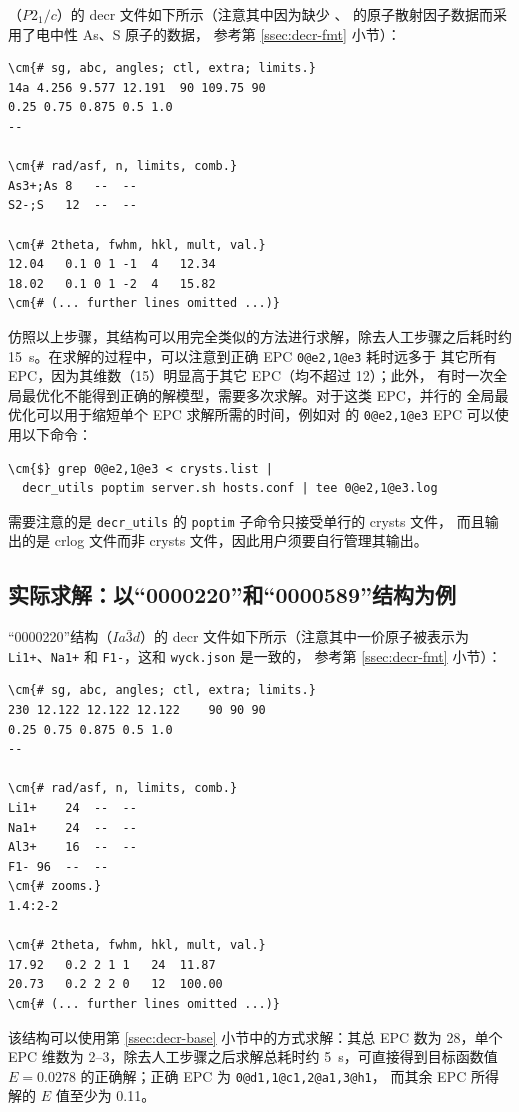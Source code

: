 （$P2_1/c$）的 decr 文件如下所示（注意其中因为缺少 、%
 的原子散射因子数据而采用了电中性 As、S 原子的数据，
参考第 \ref{ssec:decr-fmt} 小节）：
\begin{Verbatim}
\cm{# sg, abc, angles; ctl, extra; limits.}
14a	4.256 9.577 12.191	90 109.75 90
0.25 0.75 0.875	0.5 1.0
--

\cm{# rad/asf, n, limits, comb.}
As3+;As	8	--	--
S2-;S	12	--	--

\cm{# 2theta, fwhm, hkl, mult, val.}
12.04	0.1	0 1 -1	4	12.34
18.02	0.1	0 1 -2	4	15.82
\cm{# (... further lines omitted ...)}
\end{Verbatim}
仿照以上步骤，其结构可以用完全类似的方法进行求解，除去人工步骤之后耗时约
\SI{15}{\second}。在求解的过程中，可以注意到正确 EPC \verb|0@e2,1@e3| 耗时远多于
其它所有 EPC，因为其维数（15）明显高于其它 EPC（均不超过 12）；此外，
有时一次全局最优化不能得到正确的解模型，需要多次求解。对于这类 EPC，并行的
全局最优化可以用于缩短单个 EPC 求解所需的时间，例如对 
的 \verb|0@e2,1@e3| EPC 可以使用以下命令：
\begin{Verbatim}
\cm{$} grep 0@e2,1@e3 < crysts.list |
  decr_utils poptim server.sh hosts.conf | tee 0@e2,1@e3.log
\end{Verbatim}
需要注意的是 \verb|decr_utils| 的 \verb|poptim| 子命令只接受单行的 crysts 文件，
而且输出的是 crlog 文件而非 crysts 文件，因此用户须要自行管理其输出。

\subsection{实际求解：以“0000220”和“0000589”结构为例}\label{ssec:decr-auto}

“0000220”结构（$Ia\bar3d$）的 decr 文件如下所示（注意其中一价原子被表示为
\verb|Li1+|、\verb|Na1+| 和 \verb|F1-|，这和 \verb|wyck.json| 是一致的，
参考第 \ref{ssec:decr-fmt} 小节）：
\begin{Verbatim}
\cm{# sg, abc, angles; ctl, extra; limits.}
230	12.122 12.122 12.122	90 90 90
0.25 0.75 0.875	0.5 1.0
--

\cm{# rad/asf, n, limits, comb.}
Li1+	24	--	--
Na1+	24	--	--
Al3+	16	--	--
F1-	96	--	--
\cm{# zooms.}
1.4:2-2

\cm{# 2theta, fwhm, hkl, mult, val.}
17.92	0.2	2 1 1	24	11.87
20.73	0.2	2 2 0	12	100.00
\cm{# (... further lines omitted ...)}
\end{Verbatim}
该结构可以使用第 \ref{ssec:decr-base} 小节中的方式求解：其总 EPC 数为 28，单个
EPC 维数为 2--3，除去人工步骤之后求解总耗时约 \SI{5}{s}，可直接得到目标函数值
$E = 0.0278$ 的正确解；正确 EPC 为 \verb|0@d1,1@c1,2@a1,3@h1|，
而其余 EPC 所得解的 $E$ 值至少为 0.11。


